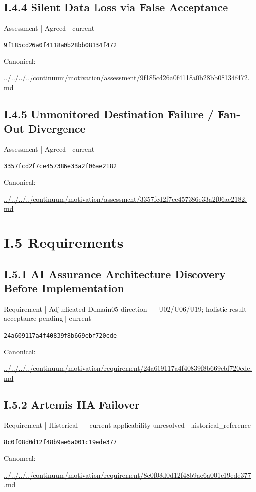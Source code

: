 \documentclass[10pt,a4paper]{article}
\begin{document}
\subsection*{I.4.4 Silent Data Loss via False Acceptance}
{\small Assessment | Agreed | current}\par
\texttt{9f185cd26a0f4118a0b28bb08134f472}\par
Canonical: \par
{\footnotesize\url{../../../../continuum/motivation/assessment/9f185cd26a0f4118a0b28bb08134f472.md}}\par
\subsection*{I.4.5 Unmonitored Destination Failure / Fan-Out Divergence}
{\small Assessment | Agreed | current}\par
\texttt{3357fcd2f7ce457386e33a2f06ae2182}\par
Canonical: \par
{\footnotesize\url{../../../../continuum/motivation/assessment/3357fcd2f7ce457386e33a2f06ae2182.md}}\par
\section*{I.5 Requirements}
\subsection*{I.5.1 AI Assurance Architecture Discovery Before Implementation}
{\small Requirement | Adjudicated Domain05 direction — U02/U06/U19; holistic result acceptance pending | current}\par
\texttt{24a609117a4f40839f8b669ebf720cde}\par
Canonical: \par
{\footnotesize\url{../../../../continuum/motivation/requirement/24a609117a4f40839f8b669ebf720cde.md}}\par
\subsection*{I.5.2 Artemis HA Failover}
{\small Requirement | Historical — current applicability unresolved | historical\_reference}\par
\texttt{8c0f08d0d12f48b9ae6a001c19ede377}\par
Canonical: \par
{\footnotesize\url{../../../../continuum/motivation/requirement/8c0f08d0d12f48b9ae6a001c19ede377.md}}\par
\end{document}
